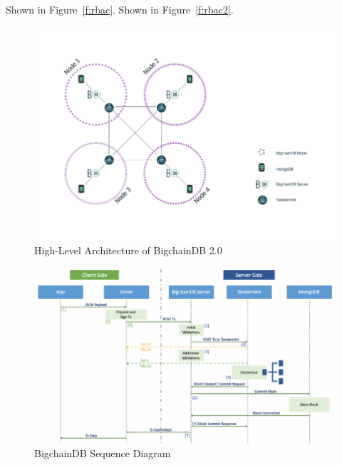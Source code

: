 Shown in Figure~\ref{f:rbac}.
Shown in Figure~\ref{f:rbac2}.

\begin{figure}[!htb]
	\centering\includegraphics[width=\columnwidth]{images/bdb-arch.pdf}  
	\caption{High-Level Architecture of BigchainDB 
		2.0~\cite{bdb18d}}\label{f:bdb}
\end{figure}

\begin{figure}[!htb]
	\centering\includegraphics[width=\columnwidth]{images/bdb-seq.pdf}  
	\caption{BigchainDB Sequence Diagram~\cite{gautam18}}\label{f:bdb2}
\end{figure}

